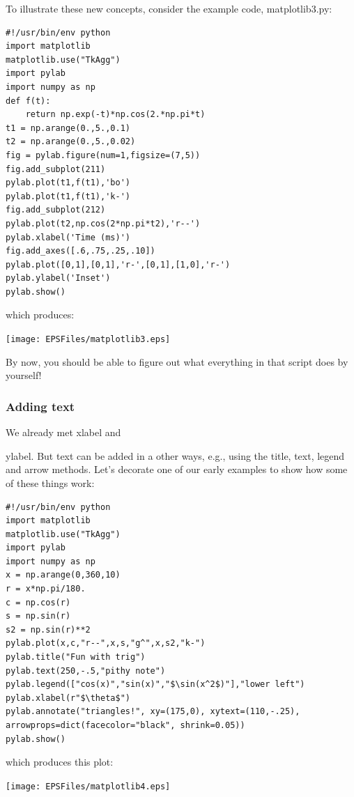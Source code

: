 \documentclass[11pt]{book}
\begin{document}
{{{{{To illustrate these new concepts, consider the example code, {\color{blue}matplotlib3.py}:

{ \color{blue} \begin{verbatim}
#!/usr/bin/env python
import matplotlib
matplotlib.use("TkAgg")
import pylab
import numpy as np
def f(t):
    return np.exp(-t)*np.cos(2.*np.pi*t)
t1 = np.arange(0.,5.,0.1)
t2 = np.arange(0.,5.,0.02)
fig = pylab.figure(num=1,figsize=(7,5))
fig.add_subplot(211)
pylab.plot(t1,f(t1),'bo')
pylab.plot(t1,f(t1),'k-')
fig.add_subplot(212)
pylab.plot(t2,np.cos(2*np.pi*t2),'r--')
pylab.xlabel('Time (ms)')
fig.add_axes([.6,.75,.25,.10])
pylab.plot([0,1],[0,1],'r-',[0,1],[1,0],'r-')
pylab.ylabel('Inset')
pylab.show()
\end{verbatim}}

\noindent which produces:

{\texttt{[image: EPSFiles/matplotlib3.eps]}}

\noindent By now, you should be able to figure out what everything in that script does by yourself!

\subsubsection{Adding text}

We already met {\color{blue}xlabel} and {{\color{blue}ylabel}.  But text can be added in a other ways, e.g., using the  title, text, legend and arrow methods.
Let's decorate one of our early examples to show how some of these things work:

{ \color{blue} \begin{verbatim}
#!/usr/bin/env python
import matplotlib
matplotlib.use("TkAgg")
import pylab
import numpy as np
x = np.arange(0,360,10)
r = x*np.pi/180.
c = np.cos(r)
s = np.sin(r)
s2 = np.sin(r)**2
pylab.plot(x,c,"r--",x,s,"g^",x,s2,"k-")
pylab.title("Fun with trig")
pylab.text(250,-.5,"pithy note")
pylab.legend(["cos(x)","sin(x)","$\sin(x^2$)"],"lower left")
pylab.xlabel(r"$\theta$")
pylab.annotate("triangles!", xy=(175,0), xytext=(110,-.25), arrowprops=dict(facecolor="black", shrink=0.05))
pylab.show()
\end{verbatim}}

\noindent which produces this plot:

\texttt{[image: EPSFiles/matplotlib4.eps]}

}}}}}}
\end{document}
